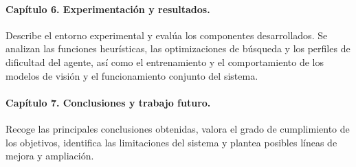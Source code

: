 \paragraph{Capítulo 6. Experimentación y resultados.} Describe el entorno experimental y evalúa los componentes desarrollados. Se analizan las funciones heurísticas, las optimizaciones de búsqueda y los perfiles de dificultad del agente, así como el entrenamiento y el comportamiento de los modelos de visión y el funcionamiento conjunto del sistema.

\paragraph{Capítulo 7. Conclusiones y trabajo futuro.} Recoge las principales conclusiones obtenidas, valora el grado de cumplimiento de los objetivos, identifica las limitaciones del sistema y plantea posibles líneas de mejora y ampliación.

\endgroup